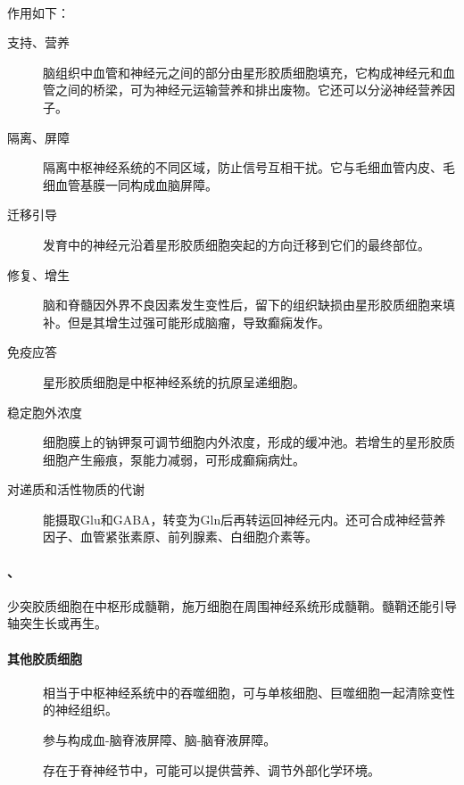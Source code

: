 \paragraph{}

作用如下：
\begin{description}
	\item[支持、营养] 脑组织中血管和神经元之间的部分由星形胶质细胞填充，它构成神经元和血管之间的桥梁，可为神经元运输营养和排出废物。它还可以分泌神经营养因子。
	\item[隔离、屏障] 隔离中枢神经系统的不同区域，防止信号互相干扰。它与毛细血管内皮、毛细血管基膜一同构成血脑屏障。
	\item[迁移引导] 发育中的神经元沿着星形胶质细胞突起的方向迁移到它们的最终部位。
	\item[修复、增生] 脑和脊髓因外界不良因素发生变性后，留下的组织缺损由星形胶质细胞来填补。但是其增生过强可能形成脑瘤，导致癫痫发作。
	\item[免疫应答] 星形胶质细胞是中枢神经系统的抗原呈递细胞。
	\item[稳定胞外浓度] 细胞膜上的钠钾泵可调节细胞内外浓度，形成的缓冲池。若增生的星形胶质细胞产生瘢痕，泵能力减弱，可形成癫痫病灶。
	\item[对递质和活性物质的代谢] 能摄取Glu和GABA，转变为Gln后再转运回神经元内。还可合成神经营养因子、血管紧张素原、前列腺素、白细胞介素等。
\end{description}

\paragraph{、}

少突胶质细胞在中枢形成髓鞘，施万细胞在周围神经系统形成髓鞘。髓鞘还能引导轴突生长或再生。

\paragraph{其他胶质细胞}

\begin{description}
	\item[] 相当于中枢神经系统中的吞噬细胞，可与单核细胞、巨噬细胞一起清除变性的神经组织。
	\item[] 参与构成血-脑脊液屏障、脑-脑脊液屏障。
	\item[] 存在于脊神经节中，可能可以提供营养、调节外部化学环境。
\end{description}

